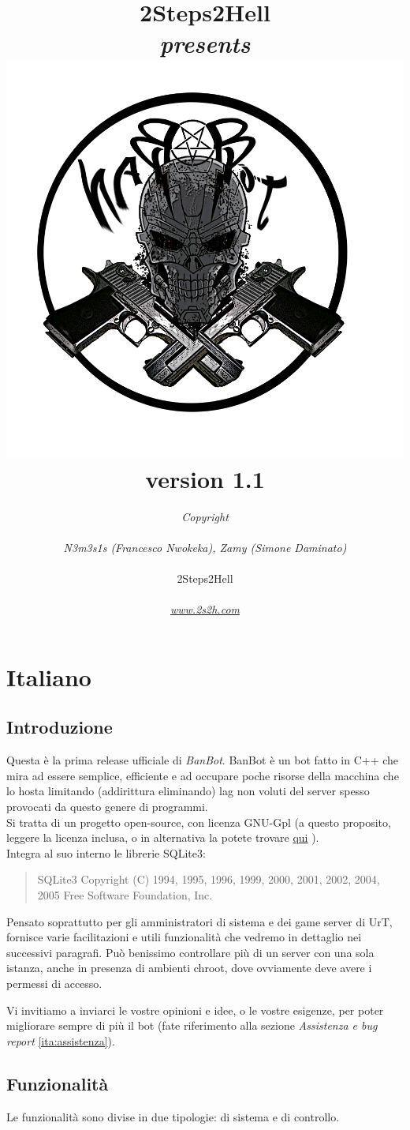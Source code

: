 \documentclass[a4paper]{article}
\title{ \bfseries 2Steps2Hell \\ \textit{presents} \\ \includegraphics[scale=0.36]{img/banbot.jpg}\\ version 1.1}
\author{\textit{Copyright \textcopyright 2010} \\\\ \textit{N3m3s1s (Francesco Nwokeka), Zamy (Simone Daminato)}\\\\2Steps2Hell\\\\\href{http://www.2s2h.com}{\textit{www.2s2h.com}}}
\date{}
\begin{document}
\maketitle
\newpage
\tableofcontents
\newpage

\section{Italiano}
\subsection {Introduzione}
Questa \`e la prima release ufficiale di \textit{BanBot}.
 BanBot \`e un bot fatto in C++ che mira ad essere semplice, efficiente e ad occupare poche risorse della macchina che lo hosta limitando (addirittura eliminando) lag non voluti del server spesso provocati da questo genere di programmi.\\
Si tratta di un progetto open-source, con licenza GNU-Gpl (a questo proposito, leggere la licenza inclusa, o in alternativa la potete trovare \href{http://www.gnu.org/licenses/}{qui} ).\\
Integra al suo interno le librerie SQLite3:
\begin{quote}
 SQLite3 Copyright (C) 1994, 1995, 1996, 1999, 2000, 2001, 2002, 2004, 2005 Free Software Foundation, Inc.
\end{quote}

Pensato soprattutto per gli amministratori di sistema e dei game server di UrT, fornisce varie facilitazioni e utili funzionalit\`a che vedremo in dettaglio nei successivi paragrafi.
Pu\`o benissimo controllare pi\`u di un server con una sola istanza, anche in presenza di ambienti chroot, dove ovviamente deve avere i permessi di accesso.

Vi invitiamo a inviarci le vostre opinioni e idee, o le vostre esigenze, per poter migliorare sempre di pi\`u il bot (fate riferimento alla sezione \textit{Assistenza e bug report} \ref{ita:assistenza}).

\subsection {Funzionalit\`a}
Le funzionalit\`a sono divise in due tipologie: di sistema e di controllo.
\end{document}
